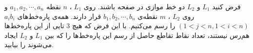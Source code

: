 \EXERCISE
فرض کنید
$L_1$
و
$L_2$
دو خط موازی در صفحه باشند. روی
$L_1$
،
$n$
نقطه
$a_1, a_2, \cdots, a_n$
و روی
$L_2$
،
$m$
نقطه‌ی
$b_1, b_2, \cdots, b_n$
قرار دارند. همه‌ی پاره‌خط‌های
$a_ib_i$
$(1 < j < n, 1 < i < n)$
را رسم می‌کنیم. با این فرض که هیچ
$3$
تایی از این پاره‌خط‌ها هم‌رس نیستند، تعداد نقاط تقاطع حاصل از رسم این پاره‌خط‌ها را که بین
$L_1$
و
$L_2$
ایجاد می‌شوند را بیابید.